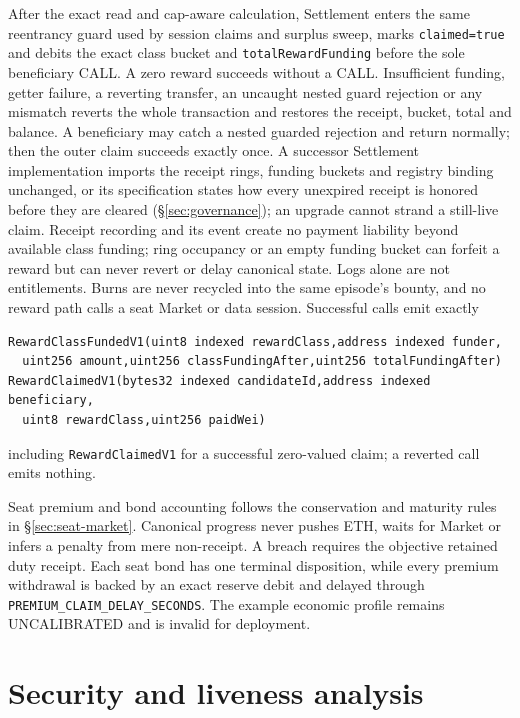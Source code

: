 \documentclass[a4paper,11pt]{article}
\newcommand{\code}[1]{\nolinkurl{#1}}
\begin{document}
After the exact read and cap-aware calculation, Settlement enters the same
reentrancy guard used by session claims and surplus sweep, marks
\code{claimed=true} and debits the exact class bucket and
\code{totalRewardFunding}
before the sole beneficiary CALL.  A zero reward succeeds without a CALL.
Insufficient funding, getter failure, a reverting transfer, an uncaught nested
guard rejection or any mismatch reverts the whole transaction and restores the
receipt, bucket, total and balance.  A beneficiary may catch a nested guarded
rejection and return normally; then the outer claim succeeds exactly once.
A successor Settlement implementation imports the receipt rings, funding
buckets and registry binding unchanged, or its specification states how every
unexpired receipt is honored before they are cleared (\S\ref{sec:governance});
an upgrade cannot strand a still-live claim.  Receipt recording and its event create no payment liability
beyond available class funding; ring occupancy or an empty funding bucket can
forfeit a reward but can never revert or delay canonical state.  Logs alone are
not entitlements.  Burns are never recycled into the same episode's bounty,
and no reward path calls a seat Market or data session.
Successful calls emit exactly
\begin{verbatim}
RewardClassFundedV1(uint8 indexed rewardClass,address indexed funder,
  uint256 amount,uint256 classFundingAfter,uint256 totalFundingAfter)
RewardClaimedV1(bytes32 indexed candidateId,address indexed beneficiary,
  uint8 rewardClass,uint256 paidWei)
\end{verbatim}
including \code{RewardClaimedV1} for a successful zero-valued claim; a reverted
call emits nothing.

Seat premium and bond accounting follows the conservation and maturity rules in
\S\ref{sec:seat-market}.  Canonical progress never pushes ETH, waits for Market
or infers a penalty from mere non-receipt.  A breach requires the objective
retained duty receipt.  Each seat bond has one terminal disposition, while every
premium withdrawal is backed by an exact reserve debit and delayed through
\code{PREMIUM_CLAIM_DELAY_SECONDS}.  The example economic profile remains
UNCALIBRATED and is invalid for deployment.

\section{Security and liveness analysis}\label{sec:analysis}
\end{document}
